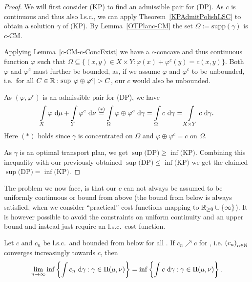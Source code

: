 \begin{proof}
	We will first consider (KP) to find an admissible pair for (DP). As $c$ is continuous and thus also l.s.c., we can apply Theorem~\ref{KPAdmitPolishLSC} to obtain a solution $\gamma$ of (KP). By Lemma~\ref{OTPlanc-CM} the set $\Omega := \text{supp}(\gamma)$ is $c$-CM\@.

	Applying Lemma~\ref{c-CM-c-ConcExist} we have a $c$-concave and thus continuous function $\varphi$ such that $\Omega \subseteq \{ (x, y) \in X \times Y : \varphi(x) + \varphi^c(y) = c(x, y) \}$. Both $\varphi$ and $\varphi^c$ must further be bounded, as, if we assume $\varphi$ and $\varphi^c$ to be unbounded, i.e.~for all $C \in \R: \sup \vert \varphi \oplus \varphi^c \vert > C$, our $c$ would also be unbounded.
	
	As $(\varphi, \varphi^c)$ is an admissible pair for (DP), we have
	\[ \int\limits_X \varphi~\D + \int\limits_Y \varphi^c~\D[\nu] \overset{(*)}{=} \int\limits_{\Omega} \varphi \oplus \varphi^c~\D[\gamma]  = \int\limits_{\Omega} c~\D[\gamma] = \int\limits_{X \times Y} c~\D[\gamma]. \]
	Here $(*)$ holds since $\gamma$ is concentrated on $\Omega$ and $\varphi \oplus \varphi^c = c$ on $\Omega$.

	As $\gamma$ is an optimal transport plan, we get $\sup \text{(DP)} \ge \inf \text{(KP)}$. Combining this inequality with our previously obtained $\sup \text{(DP)} \le \inf \text{(KP)}$ we get the claimed $\sup \text{(DP)} = \inf \text{(KP)}$.
\end{proof}

The problem we now face, is that our $c$ can not always be assumed to be uniformly continuous or bound from above (the bound from below is always satisfied, when we consider ``practical'' cost functions mapping to $\RZero \cup \{ \infty \}$). It is however possible to avoid the constraints on uniform continuity and an upper bound and instead just require an l.s.c.\ cost function.

\begin{lemma}\label{ConvOfKanProb}
	Let $c$ and $c_n$ be l.s.c.\ and bounded from below for all \NinN. If $c_n \nearrow c$ for \Ninf, i.e. ${(c_n)}_{\NinN}$ converges increasingly towards $c$, then
	\[ \lim\limits_{\Ninf} \inf \left\{ \int c_n~\D[\gamma] : \gamma \in \TP{\mu}{\nu} \right\} = \inf \left\{ \int c~\D[\gamma] : \gamma \in \TP{\mu}{\nu} \right\}. \]
\end{lemma}

